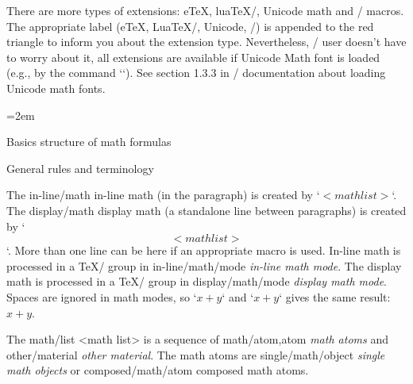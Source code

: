 There are more types of extensions: e\TeX, lua\TeX/, Unicode math and
\OpTeX/ macros. The appropriate label (e\TeX, Lua\TeX/, Unicode, \OpTeX/)
is appended to the red triangle to inform you about the extension type.
Nevertheless, \OpTeX/ user doesn't have to worry about it, all extensions
are available if Unicode Math font is loaded (e.g., by the command
`\fonfam[lmfonts]`). See section 1.3.3 in \OpTeX/ documentation about
loading Unicode math fonts.

{\iindent=2em
\bigskip
\maketoc }
\vfil\break

\sec Basics structure of math formulas

\secc General rules and terminology

The \ii in-line/math in-line math (in the paragraph) is created by `$<math list>$`. The
\ii display/math display math (a standalone line between paragraphs) is created by `$$<math list>$$`.
More than one line can be here if an appropriate macro is used. In-line math is
processed in a \TeX/ group in \ii in-line/math/mode {\em in-line math mode}. The display math is
processed in a \TeX/ group in \ii display/math/mode {\em display math mode}. Spaces are
ignored in math modes, so `$x+y$` and `$x + y$` gives the same result: $x+y$.

The \ii math/list <math list> is a sequence of \ii math/atom,atom {\em math atoms} and
\ii other/material {\em other material}.
The math atoms are \ii single/math/object {\em single math objects} or
\ii composed/math/atom composed math atoms.

